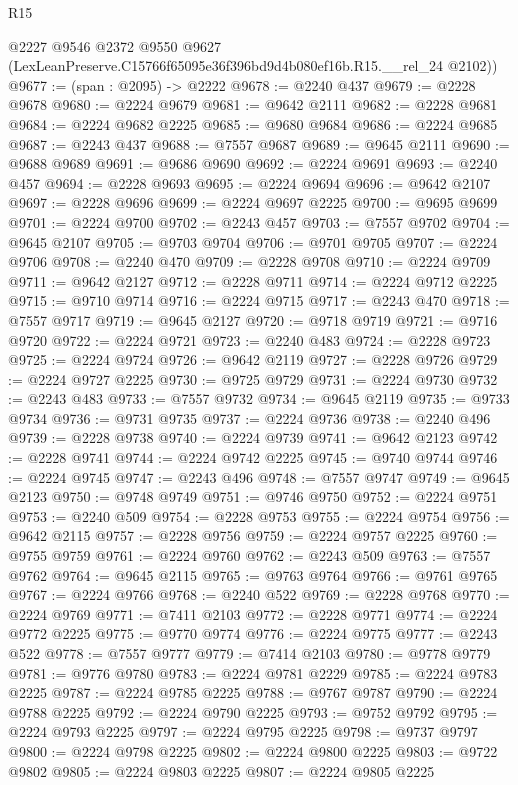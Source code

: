\begin{lexlean}{R15}
\begin{coremodule}
      @2227
      @9546
      @2372
      @9550
      @9627
      (LexLeanPreserve.C15766f65095e36f396bd9d4b080ef16b.R15.__rel_24 @2102))
@9677 := (span : @2095) -> @2222
@9678 := @2240 @437
@9679 := @2228 @9678
@9680 := @2224 @9679
@9681 := @9642 @2111
@9682 := @2228 @9681
@9684 := @2224 @9682 @2225
@9685 := @9680 @9684
@9686 := @2224 @9685
@9687 := @2243 @437
@9688 := @7557 @9687
@9689 := @9645 @2111
@9690 := @9688 @9689
@9691 := @9686 @9690
@9692 := @2224 @9691
@9693 := @2240 @457
@9694 := @2228 @9693
@9695 := @2224 @9694
@9696 := @9642 @2107
@9697 := @2228 @9696
@9699 := @2224 @9697 @2225
@9700 := @9695 @9699
@9701 := @2224 @9700
@9702 := @2243 @457
@9703 := @7557 @9702
@9704 := @9645 @2107
@9705 := @9703 @9704
@9706 := @9701 @9705
@9707 := @2224 @9706
@9708 := @2240 @470
@9709 := @2228 @9708
@9710 := @2224 @9709
@9711 := @9642 @2127
@9712 := @2228 @9711
@9714 := @2224 @9712 @2225
@9715 := @9710 @9714
@9716 := @2224 @9715
@9717 := @2243 @470
@9718 := @7557 @9717
@9719 := @9645 @2127
@9720 := @9718 @9719
@9721 := @9716 @9720
@9722 := @2224 @9721
@9723 := @2240 @483
@9724 := @2228 @9723
@9725 := @2224 @9724
@9726 := @9642 @2119
@9727 := @2228 @9726
@9729 := @2224 @9727 @2225
@9730 := @9725 @9729
@9731 := @2224 @9730
@9732 := @2243 @483
@9733 := @7557 @9732
@9734 := @9645 @2119
@9735 := @9733 @9734
@9736 := @9731 @9735
@9737 := @2224 @9736
@9738 := @2240 @496
@9739 := @2228 @9738
@9740 := @2224 @9739
@9741 := @9642 @2123
@9742 := @2228 @9741
@9744 := @2224 @9742 @2225
@9745 := @9740 @9744
@9746 := @2224 @9745
@9747 := @2243 @496
@9748 := @7557 @9747
@9749 := @9645 @2123
@9750 := @9748 @9749
@9751 := @9746 @9750
@9752 := @2224 @9751
@9753 := @2240 @509
@9754 := @2228 @9753
@9755 := @2224 @9754
@9756 := @9642 @2115
@9757 := @2228 @9756
@9759 := @2224 @9757 @2225
@9760 := @9755 @9759
@9761 := @2224 @9760
@9762 := @2243 @509
@9763 := @7557 @9762
@9764 := @9645 @2115
@9765 := @9763 @9764
@9766 := @9761 @9765
@9767 := @2224 @9766
@9768 := @2240 @522
@9769 := @2228 @9768
@9770 := @2224 @9769
@9771 := @7411 @2103
@9772 := @2228 @9771
@9774 := @2224 @9772 @2225
@9775 := @9770 @9774
@9776 := @2224 @9775
@9777 := @2243 @522
@9778 := @7557 @9777
@9779 := @7414 @2103
@9780 := @9778 @9779
@9781 := @9776 @9780
@9783 := @2224 @9781 @2229
@9785 := @2224 @9783 @2225
@9787 := @2224 @9785 @2225
@9788 := @9767 @9787
@9790 := @2224 @9788 @2225
@9792 := @2224 @9790 @2225
@9793 := @9752 @9792
@9795 := @2224 @9793 @2225
@9797 := @2224 @9795 @2225
@9798 := @9737 @9797
@9800 := @2224 @9798 @2225
@9802 := @2224 @9800 @2225
@9803 := @9722 @9802
@9805 := @2224 @9803 @2225
@9807 := @2224 @9805 @2225

\end{coremodule}
\end{lexlean}
